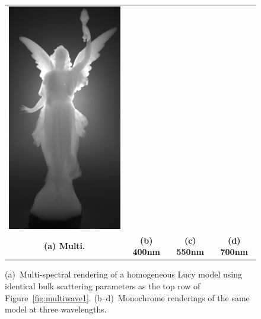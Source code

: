 \begin{figure}
\begin{tabular}{cccc}
        \includegraphics[width=\resLen]{images/lucy/color_700nm.jpg}
        \\
        \textbf{(a) Multi.} & \textbf{(b) 400nm} & \textbf{(c) 550nm} & \textbf{(d) 700nm}
    \end{tabular}
    \caption{\label{fig:multiwave2}
        (a)~Multi-spectral rendering of a homogeneous Lucy model using identical bulk scattering parameters as the top row of Figure~\ref{fig:multiwave1}.
        (b--d)~Monochrome renderings of the same model at three wavelengths.
    }
\end{figure}

